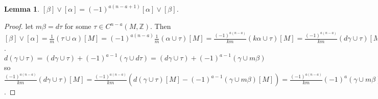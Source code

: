\documentclass{report}
\newtheorem{lemma}{Lemma}
\begin{document}
\begin{lemma}
$[\beta]\vee[\alpha]=(-1)^{a(n-a+1)}[\alpha]\vee[\beta]$.
\end{lemma}
\begin{proof}
let $m\beta=d\tau$ for some $\tau\in C^{n-a}(M,\mathbb{Z})$. Then $[\beta]\vee[\alpha]=\frac{1}{m}(\tau\cup\alpha)[M]=(-1)^{a(n-a)}\frac{1}{m}(\alpha\cup\tau)[M]=\frac{(-1)^{a(n-a)}}{km}(k\alpha\cup\tau)[M]=\frac{(-1)^{a(n-a)}}{km}(d\gamma\cup\tau)[M]$. $d(\gamma\cup\tau)=(d\gamma\cup\tau)+(-1)^{a-1}(\gamma\cup d\tau)=(d\gamma\cup\tau)+(-1)^{a-1}(\gamma\cup m\beta)$ so $\frac{(-1)^{a(n-a)}}{km}(d\gamma\cup\tau)[M]=\frac{(-1)^{a(n-a)}}{km}(d(\gamma\cup\tau)[M]-(-1)^{a-1}(\gamma\cup m\beta)[M])=\frac{(-1)^{a(n-a)}}{km}(-1)^a(\gamma\cup m\beta)[M]=\frac{(-1)^{a(n-a+1)}}{k}(\gamma\cup\beta)[M]=(-1)^{a(n-a+1)}[\alpha]\vee[\beta]$.
\end{proof}
\end{document}
